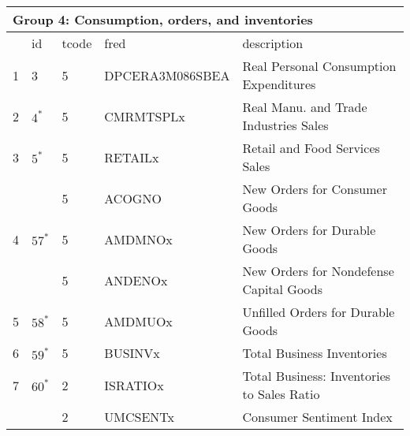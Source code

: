 \begin{table}[ht] 
\centering 
\begin{tabular}{lllll}
\multicolumn{5}{l}{Group 4: Consumption, orders, and inventories} \\
\toprule
 & id & tcode & fred & description \\
\midrule
1 & 3 & 5 & DPCERA3M086SBEA & Real Personal Consumption Expenditures \\
2 & $4^*$ & 5 & CMRMTSPLx & Real Manu. and Trade Industries Sales \\
3 & $5^*$ & 5 & RETAILx & Retail and Food Services Sales \\
\rowcolor{lightgray}  & & 5 & ACOGNO & New Orders for Consumer Goods \\
4 & $57^*$ & 5 & AMDMNOx & New Orders for Durable Goods \\
\rowcolor{lightgray} & & 5 & ANDENOx & New Orders for Nondefense Capital Goods \\
5 & $58^*$ & 5 & AMDMUOx & Unfilled Orders for Durable Goods \\
6 & $59^*$ & 5 & BUSINVx & Total Business Inventories \\
7 & $60^*$ & 2 & ISRATIOx & Total Business: Inventories to Sales Ratio \\
\rowcolor{lightgray} & & 2 & UMCSENTx & Consumer Sentiment Index \\
\bottomrule
\end{tabular}  
\end{table} 